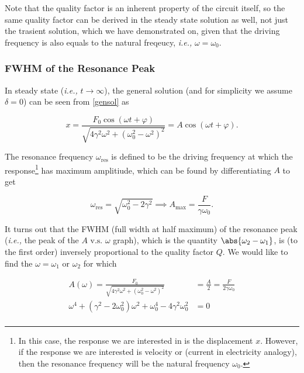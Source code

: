 \documentclass[english,a4paper,12pt]{report}
\begin{document}
Note that the quality factor is an inherent property of the circuit itself, so the same quality factor can be derived in the steady state solution as well, not just the trasient solution, which we have demonstrated on, given that the driving frequency is also equals to the natural freqeucy, \textit{i.e.,} \(\omega = \omega _{0} \). 

\subsubsection{FWHM of the Resonance Peak}

In steady state (\textit{i.e.,} \(t \to \infty\)), the general solution (and for simplicity we assume \(\delta = 0\)) can be seen from \cref{gensol} as 

\begin{equation}
    x = \frac{F_0 \cos  (\omega t+\varphi )}{\sqrt{4\gamma ^2\omega ^2+ (\omega _{0}^2 - \omega ^2 )^2} } = A \cos (\omega t+\varphi ).
\end{equation}

The resonance frequency \(\omega _{\text{res} } \) is defined to be the driving frequency at which the response\footnote{In this case, the response we are interested in is the displacement \(x\). However, if the response we are interested is velocity or (current in electricity analogy), then the resonance frequency will be the natural frequency \(\omega _{0} \).} has maximum amplitiude, which can be found by differentiating \(A\) to get

\begin{equation}
    \omega _{\text{res} } = \sqrt{\omega _{0}^2 - 2\gamma ^2 } \implies A_{\text{max} } = \frac{F}{\gamma \omega _{0} }.  
\end{equation}

It turns out that the FWHM (full width at half maximum) of the resonance peak (\textit{i.e.,} the peak of the \(A \text{ v.s. } \omega  \) graph), which is the quantity \(\abs{\omega _{2} - \omega _{1} } \), is (to the first order) inversely proportional to the quality factor \(Q\). We would like to find the \(\omega = \omega _{1}\text { or } \omega _{2}  \) for which 

\begin{equation}
    \begin{aligned} 
    A(\omega ) = \frac{F_0 }{\sqrt{4\gamma ^2\omega  ^2+ (\omega _{0}^2 - \omega  ^2 )^2} } &= \frac{A}{2} = \frac{F}{2\gamma \omega _{0} } \\
    \omega ^{4} + (\gamma ^2 - 2\omega _{0}^2 ) \omega ^2+\omega _{0}^{4} - 4\gamma ^2\omega _{0}^2 &= 0\\    
    \end{aligned} 
\end{equation}
\end{document}
